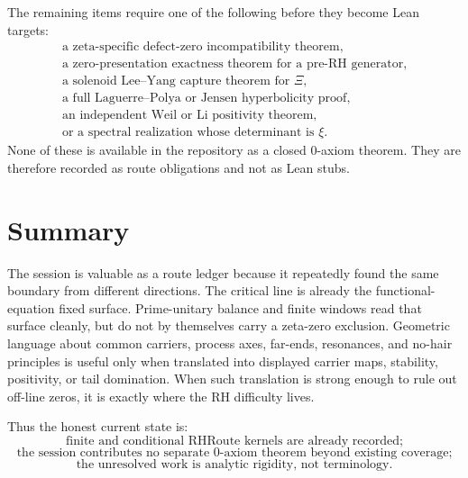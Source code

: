 The remaining items require one of the following before they become Lean
targets:
$$
\begin{gathered}
\text{a zeta-specific defect-zero incompatibility theorem},\\
\text{a zero-presentation exactness theorem for a pre-RH generator},\\
\text{a solenoid Lee--Yang capture theorem for }\Xi,\\
\text{a full Laguerre--Polya or Jensen hyperbolicity proof},\\
\text{an independent Weil or Li positivity theorem},\\
\text{or a spectral realization whose determinant is }\xi.
\end{gathered}
$$
None of these is available in the repository as a closed 0-axiom theorem.
They are therefore recorded as route obligations and not as Lean stubs.

\section{Summary}
\label{sec:rh-ledger-summary}

The session is valuable as a route ledger because it repeatedly found the
same boundary from different directions.  The critical line is already the
functional-equation fixed surface.  Prime-unitary balance and finite windows
read that surface cleanly, but do not by themselves carry a zeta-zero
exclusion.  Geometric language about common carriers, process axes,
far-ends, resonances, and no-hair principles is useful only when translated
into displayed carrier maps, stability, positivity, or tail domination.
When such translation is strong enough to rule out off-line zeros, it is
exactly where the RH difficulty lives.

Thus the honest current state is:
$$
\boxed{
\text{finite and conditional RHRoute kernels are already recorded;}
}
$$
$$
\boxed{
\text{the session contributes no separate 0-axiom theorem beyond existing coverage;}
}
$$
$$
\boxed{
\text{the unresolved work is analytic rigidity, not terminology.}
}
$$

